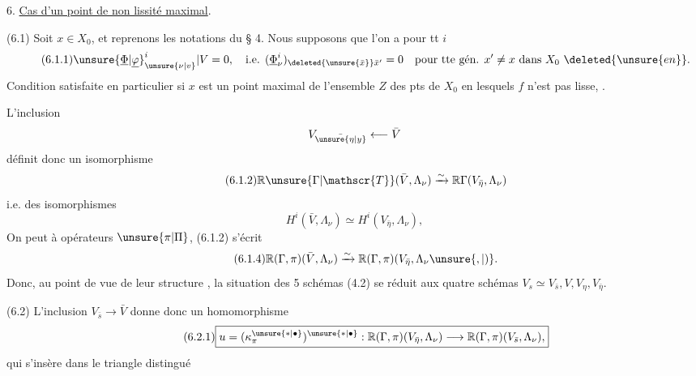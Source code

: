 
6. \uline{Cas d'un point de non lissité  maximal}. 

(6.1) Soit $x\in X_0$, et  reprenons les notations du § 4. Nous supposons que l'on a pour tt $i$
\[
\tag*{(6.1.1)}
{\unsure{\underline{\Phi}|\underline{\varphi}}}^i_{\unsure{\nu|v}}|V=0,\quad\text{i.e. }(\underline{\Phi}^i_\nu)_{\deleted{\unsure{\bar{x}}}\bar{x}'}=0\quad\text{pour tte gén. }x'\ne x\text{ dans }X_0\ \deleted{\unsure{en}}.
\]
Condition satisfaite en particulier si $x$ est un point maximal de l'ensemble $Z$ des pts de $X_0$ en lesquels $f$ n'est pas lisse, .

L'inclusion
\[
V_{\bar{\unsure{\eta|y}}}\longleftarrow\bar V
\]
définit donc un isomorphisme
\[
\tag*{(6.1.2)}
\mathbb{R}\unsure{\Gamma|\mathscr{T}}(\bar V,\Lambda_\nu)\xrightarrow{\sim}\mathbb{R}\Gamma(V_{\bar\eta},\Lambda_\nu)
\]
i.e. des isomorphismes
\[
\tag*{(6.1.3)}H^i(\bar V,\Lambda_\nu)\simeq H^i(V_{\bar\eta},\Lambda_\nu),
\]
On peut   à opérateurs $\unsure{\pi|\Pi}$, (6.1.2)  s'écrit
\[
\tag*{(6.1.4)}\mathbb{R}(\Gamma,\pi)(\bar V,\Lambda_\nu)\xrightarrow{\sim}\mathbb{R}(\Gamma,\pi)(V_{\bar\eta},\Lambda_\nu\unsure{,|)}.
\]
Donc, au point de vue de leur structure , la situation des 5 schémas (4.2) se réduit aux quatre schémas $V_s\simeq V_{\bar s},V,V_\eta,V_{\bar\eta}$.

(6.2) L'inclusion $V_{\bar s}\longrightarrow\bar V$ donne donc un homomorphisme 
\[
\tag*{(6.2.1)}
\boxed{u=(\kappa_\pi^{\unsure{*|\bullet}})^{\unsure{*|\bullet}}:\mathbb{R}(\Gamma,\pi)(V_{\bar\eta},\Lambda_\nu)\longrightarrow\mathbb{R}(\Gamma,\pi)(V_{\bar s},\Lambda_\nu),}
\]
qui  s'insère dans le triangle distingué
\diagram{\[
\tag*{(6.2.2)}
\begin{tikzcd}[ampersand replacement=\&,column sep=small]
\& {\mathbb{R}(\Gamma,\pi)(V_{\bar s},\Lambda_\nu)\simeq\mathbb{R}\Gamma(V_s,\Lambda_\nu)^{\mathrm{triv}}=L^{\bullet\,\mathrm{triv}}}\arrow[dl] \& \\
{R^\bullet=\mathbb{R}(\Gamma,\pi)(\bar V,(\Lambda_\nu)_{V_{\bar\eta},\bar V})}\arrow[rr] \& \& {\mathbb{R}(\Gamma,\pi)(V_{\bar\eta},\Lambda_\nu)=K^\bullet}\arrow[ul]
\end{tikzcd}
\]}
